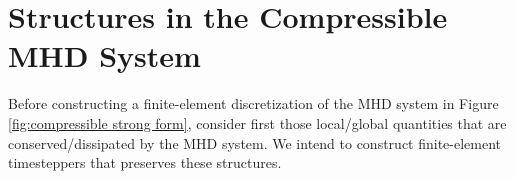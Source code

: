 \section{Structures in the Compressible MHD System}\label{cha:structures}
    Before constructing a finite-element discretization of the MHD system in Figure \ref{fig:compressible strong form}, consider first those local/global quantities that are conserved/dissipated by the MHD system. We intend to construct finite-element timesteppers that preserves these structures.


    
    
    